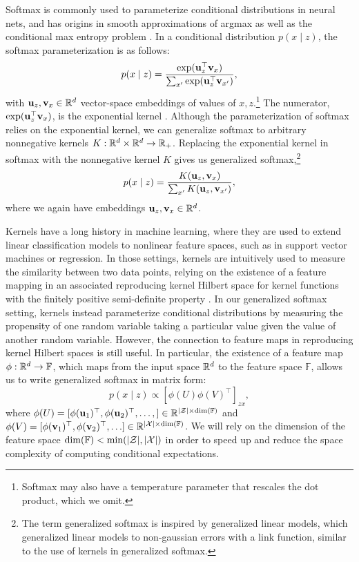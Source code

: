 \documentclass{article}
\begin{document}
Softmax is commonly used to parameterize conditional distributions in
neural nets, and has origins in smooth
approximations of argmax as well as the conditional max entropy problem \citep{}.
In a conditional distribution $p(x \mid z)$, the softmax parameterization is as follows: 
$$p(x \mid z) = \frac{\exp(\mathbf{u}_z^\top \mathbf{v}_x)}{\sum_{x'} \exp(\mathbf{u}_z^\top \mathbf{v}_{x'})},$$
with $\mathbf{u}_z,\mathbf{v}_x\in\mathbb{R}^d$ vector-space embeddings of values of $x,z$.\footnote{
Softmax may also have a temperature parameter that rescales 
the dot product, which we omit.
}
The numerator, $\exp(\mathbf{u}_z^\top \mathbf{v}_x)$, is the exponential kernel \citep{rawat2019sampledsoftmax}.
Although the parameterization of softmax relies on the exponential kernel,
we can generalize softmax to arbitrary nonnegative kernels $K: \mathbb{R}^d\times\mathbb{R}^d\to\mathbb{R}_+$.
Replacing the exponential kernel in softmax with the nonnegative kernel $K$
gives us generalized softmax,\footnote{
The term generalized softmax is inspired by generalized linear models,
which generalized linear models to non-gaussian errors with a link function,
similar to the use of kernels in generalized softmax.
}
$$p(x \mid z) = \frac{K(\mathbf{u}_z, \mathbf{v}_x)}{\sum_{x'} K(\mathbf{u}_z, \mathbf{v}_{x'})},$$
where we again have embeddings $\mathbf{u}_z,\mathbf{v}_x\in\mathbb{R}^d$.

Kernels have a long history in machine learning,
where they are used to extend linear classification models to nonlinear feature spaces,
such as in support vector machines or regression.
In those settings, kernels are intuitively used to measure the similarity between two data points,
relying on the existence of a feature mapping in an associated reproducing kernel Hilbert space 
for kernel functions with the finitely positive semi-definite property \citep{}.
In our generalized softmax setting, kernels instead parameterize conditional distributions by
measuring the propensity of one random variable taking a particular value given
the value of another random variable.
However, the connection to feature maps in reproducing kernel Hilbert spaces 
is still useful.
In particular, the existence of a feature map $\phi:\mathbb{R}^d\to\mathbb{F}$,
which maps from the input space $\mathbb{R}^d$ to the feature space $\mathbb{F}$,
allows us to write generalized softmax in matrix form:
$$p(x \mid z) \propto [\phi(U)\phi(V)^\top]_{zx},$$
where $\phi(U) = [\phi(\mathbf{u}_1)^\top, \phi(\mathbf{u}_2)^\top, \ldots,] \in\mathbb{R}^{|\mathcal{Z}|\times \dim(\mathbb{F})}$
and $\phi(V) = [\phi(\mathbf{v}_1)^\top, \phi(\mathbf{v}_2)^\top, \ldots]\in\mathbb{R}^{|\mathcal{X}|\times \dim(\mathbb{F})}$.
We will rely on the dimension of the feature space $\dim(\mathbb{F}) < \min(|\mathcal{Z}|,|\mathcal{X}|)$
in order to speed up and reduce the space complexity of computing conditional expectations.
\end{document}
